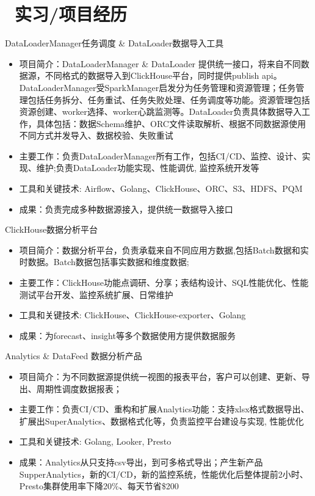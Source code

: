 \documentclass{resume}
\begin{document}
\section{\faUsers\ 实习/项目经历}
DataLoaderManager任务调度 \& DataLoader数据导入工具
\begin{itemize}
  \item 项目简介：DataLoaderManager \& DataLoader 提供统一接口，将来自不同数据源，不同格式的数据导入到ClickHouse平台，同时提供publish api。DataLoaderManager受SparkManager启发分为任务管理和资源管理；任务管理包括任务拆分、任务重试、任务失败处理、任务调度等功能。资源管理包括资源创建、worker选择、worker心跳监测等。DataLoader负责具体数据导入工作，具体包括：数据Schema维护、ORC文件读取解析、根据不同数据源使用不同方式并发导入、数据校验、失败重试
  \item 主要工作：负责DataLoaderManager所有工作，包括CI/CD、监控、设计、实现、维护;负责DataLoader功能实现、性能调优, 监控系统开发等
  \item 工具和关键技术: Airflow、Golang、ClickHouse、ORC、S3、HDFS、PQM
  \item 成果：负责完成多种数据源接入，提供统一数据导入接口
\end{itemize}
ClickHouse数据分析平台
\begin{itemize}
  \item 项目简介：数据分析平台，负责承载来自不同应用方数据,包括Batch数据和实时数据。Batch数据包括事实数据和维度数据;
  \item 主要工作：ClickHouse功能点调研、分享；表结构设计、SQL性能优化、性能测试平台开发、监控系统扩展、日常维护
  \item 工具和关键技术: ClickHouse、ClickHouse-exporter、Golang
  \item 成果：为forecast、insight等多个数据使用方提供数据服务
\end{itemize}
Analytics \& DataFeed 数据分析产品
\begin{itemize}
  \item 项目简介：为不同数据源提供统一视图的报表平台，客户可以创建、更新、导出、周期性调度数据报表；
  \item 主要工作：负责CI/CD、重构和扩展Analytics功能：支持xlsx格式数据导出、扩展出SuperAnalytics、数据格式化等，负责监控平台建设与实现, 性能优化
  \item 工具和关键技术: Golang, Looker, Presto 
  \item 成果：Analytics从只支持csv导出，到可多格式导出；产生新产品SupperAnalytics，新的CI/CD，新的监控系统，性能优化后整体提前2小时、Presto集群使用率下降20\%、每天节省\$200
\end{itemize}
\end{document}
